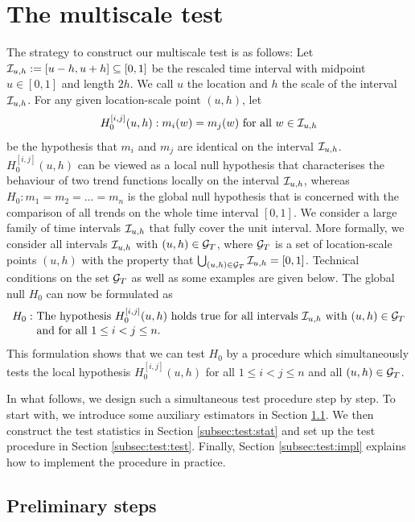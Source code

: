 \documentclass[12pt]{article}
\begin{document}
\section{The multiscale test}\label{sec:test}


The strategy to construct our multiscale test is as follows: Let $\mathcal{I}_{u, h} := [u-h, u+h] \subseteq [0,1]$ be the rescaled time interval with midpoint $u \in [0,1]$ and length $2h$. We call $u$ the location
and $h$ the scale of the interval $\mathcal{I}_{u, h}$. For any given location-scale point $(u,h)$, let
\[ H_0^{[i, j]}(u, h): m_i(w) = m_j(w) \text{ for all } w \in \mathcal{I}_{u, h} \] 
be the hypothesis that $m_i$ and $m_j$ are identical on the interval $\mathcal{I}_{u, h}$. $H_0^{[i, j]}(u, h)$ can be viewed as a local null hypothesis that characterises the behaviour of two trend functions locally on the interval $\mathcal{I}_{u, h}$, whereas $H_0: m_1 = m_2 = \ldots = m_n$ is the global null hypothesis that is concerned with the comparison of all trends on the whole time interval $[0, 1]$. We consider a large family of time intervals $\mathcal{I}_{u, h}$ that fully cover the unit interval. More formally, we consider all intervals $\mathcal{I}_{u, h}$ with $(u,h) \in \mathcal{G}_T$, where $\mathcal{G}_T$ is a set of location-scale points $(u,h)$ with the property that $\bigcup_{(u, h) \in \mathcal{G}_T} \mathcal{I}_{u, h} = [0,1]$. Technical conditions on the set $\mathcal{G}_T$ as well as some examples are given below. The global null $H_0$ can now be formulated as 
\begin{align*}
H_0: \ & \text{The hypothesis } H_0^{[i, j]}(u, h) \text{ holds true for all intervals }  \mathcal{I}_{u, h} \text{ with } (u, h) \in \mathcal{G}_T \\[-0.075cm] & \text{and for all } 1 \le i < j \le n. 
\end{align*} 
This formulation shows that we can test $H_0$ by a procedure which simultaneously tests the local hypothesis $H_0^{[i, j]}(u, h)$ for all $1 \le i < j \le n$ and all $(u,h) \in \mathcal{G}_T$. 


In what follows, we design such a simultaneous test procedure step by step. To start with, we introduce some auxiliary estimators in Section \ref{subsec:test:prep}. We then construct the test statistics in Section \ref{subsec:test:stat} and set up the test procedure in Section \ref{subsec:test:test}. Finally, Section \ref{subsec:test:impl} explains how to implement the procedure in practice. 


\subsection{Preliminary steps}\label{subsec:test:prep}
\end{document}

